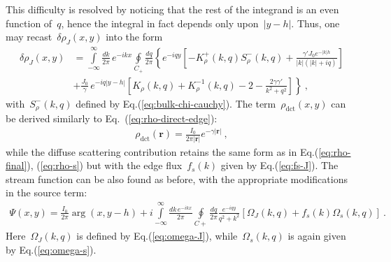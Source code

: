 \documentclass[preprint,aps,eqsecnum, prb]{revtex4-1}
\newcommand{\fplus}[1]{{#1}^{+}}
\newcommand{\fminus}[1]{{#1}^{-}}
\newcommand{\dct}[1]{{#1}_\mathrm{dct}}
\begin{document}
This difficulty is resolved by noticing that the rest of the integrand is 
an even function of~$q$, hence the integral in fact depends only 
upon~$|y - h|$. Thus, one may recast~$\delta\rho_J(x, y)$ into
the form
\begin{align}
\delta\rho_J(x, y) &= \int\limits_{-\infty}^{\infty}\frac{dk}{2\pi}\, e^{-ikx}
\oint\limits_{C_{+}} \frac{dq}{2\pi}
\left\{
e^{-iqy} \left[ - \fplus{K}_\rho(k, q) \fminus{S}_\rho(k, q)
+  \frac{\gamma' J_0 e^{-|k|h}}{|k|(|k| + iq)}\right] \right. \\ \nonumber
&+ \left. \frac{J_0}{\gamma}\, e^{-iq|y - h|} \left[
     K_\rho(k, q) + K_\rho^{-1}(k, q) - 2 
    - \frac{2\gamma \gamma'}{k^2 + q^2}
\right]
\right\}\ ,  
\end{align}
with~$\fminus{S}_\rho(k, q)$ defined by Eq.(\ref{eq:bulk-chi-cauchy}).
The term~$\dct{\rho}(x, y)$ can be derived similarly to Eq.~(\ref{eq:rho-direct-edge}):
\begin{align}
\dct{\rho}({\bm r}) = \frac{I_0}{2\pi |{\bm r}|} e^{-\gamma |{\bm r}|}\ , 
\end{align}
while the diffuse scattering contribution retains the same form as in 
Eq.(\ref{eq:rho-final}), (\ref{eq:rho-s}) but with the edge flux~$f_s(k)$
given by Eq.(\ref{eq:fs-J}).
The stream function can be also found as before, with the 
appropriate modifications in the source term:
\begin{align}
\Psi(x, y) = \frac{I_0}{2\pi} \arg (x, y - h)
  + i\int\limits_{-\infty}^{\infty} \frac{dk\, e^{-ikx}}{2\pi}
  \oint\limits_{C+} \frac{dq}{2\pi} \frac{e^{-iqy}}{q^2 + k^2}
  \left[\Omega_{J}(k, q)
  + f_s(k) \Omega_{s}(k, q) \right]\ . 
\end{align}
Here~$\Omega_{J}(k, q)$ is defined by Eq.(\ref{eq:omega-J}), 
while~$\Omega_s(k, q)$ is again given by Eq.(\ref{eq:omega-s}).
\end{document}
